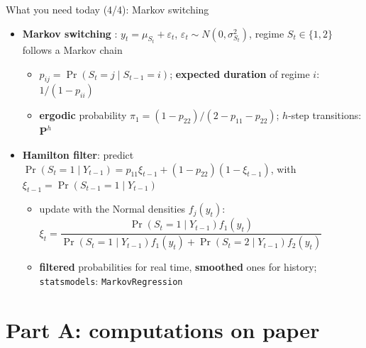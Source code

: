 \begin{frame}{What you need today (4/4): Markov switching}
\itemsize{\small}
\begin{itemize}
    \item \textbf{Markov switching} : $y_t = \mu_{S_t} + \varepsilon_t$, $\varepsilon_t \sim N(0, \sigma^2_{S_t})$, regime $S_t \in \{1, 2\}$ follows a Markov chain
    \begin{itemize}
        \item $p_{ij} = \Pr(S_t = j \mid S_{t-1} = i)$; \textbf{expected duration} of regime $i$: $1/(1 - p_{ii})$
        \item \textbf{ergodic} probability $\pi_1 = (1 - p_{22})/(2 - p_{11} - p_{22})$; $h$-step transitions: $\mathbf{P}^h$
    \end{itemize}
    \item \textbf{Hamilton filter}: predict $\Pr(S_t = 1 \mid Y_{t-1}) = p_{11}\xi_{t-1} + (1 - p_{22})(1 - \xi_{t-1})$, with $\xi_{t-1} = \Pr(S_{t-1} = 1 \mid Y_{t-1})$
    \begin{itemize}
        \item update with the Normal densities $f_j(y_t)$: $\xi_t = \dfrac{\Pr(S_t = 1 \mid Y_{t-1})f_1(y_t)}{\Pr(S_t = 1 \mid Y_{t-1})f_1(y_t) + \Pr(S_t = 2 \mid Y_{t-1})f_2(y_t)}$
        \item \textbf{filtered} probabilities for real time, \textbf{smoothed} ones for history; \texttt{statsmodels}: \texttt{MarkovRegression}
    \end{itemize}
\end{itemize}
\end{frame}


\section{Part A: computations on paper}

